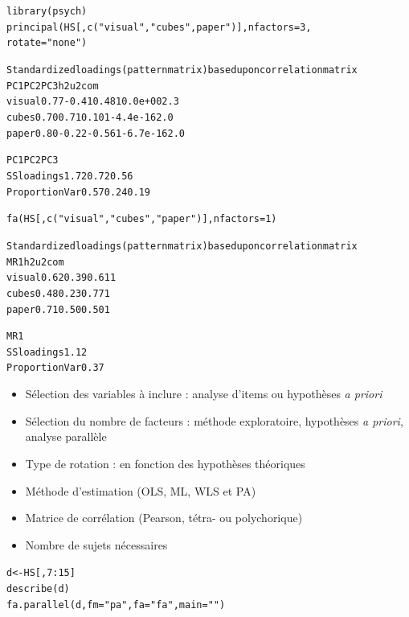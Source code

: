 \begin{alltt}
library(psych)
principal(HS[,c("visual","cubes", paper")], \textcolor{Apricot}{nfactors = 3}, 
          rotate = "none")
\end{alltt}
\begin{alltt}\small
Standardized loadings (pattern matrix) based upon correlation matrix
        PC1   PC2   PC3 h2       u2 com
visual 0.77 -0.41  0.48  1  0.0e+00 2.3
cubes  0.70  0.71  0.10  1 -4.4e-16 2.0 
paper  0.80 -0.22 -0.56  1 -6.7e-16 2.0

                       PC1  PC2  PC3
SS loadings           1.72 0.72 0.56
Proportion Var        0.57 0.24 0.19
\end{alltt}

\foilhead{}

\begin{alltt}
fa(HS[,c("visual", "cubes", "paper")], nfactors = 1)
\end{alltt}
\begin{alltt}\small
Standardized loadings (pattern matrix) based upon correlation matrix
        MR1   h2   u2 com
visual 0.62 0.39 0.61   1
cubes  0.48 0.23 0.77   1 
paper  0.71 0.50 0.50   1

                MR1
SS loadings    1.12
Proportion Var 0.37
\end{alltt}

\begin{itemize}
\item Sélection des variables à inclure : analyse d'items ou hypothèses \emph{a
    priori}
\item Sélection du nombre de facteurs : méthode exploratoire, hypothèses \emph{a
    priori}, analyse parallèle
\item Type de rotation : en fonction des hypothèses théoriques
\item Méthode d'estimation (OLS, ML, WLS et PA)
\item Matrice de corrélation (Pearson, tétra- ou polychorique)  
\item Nombre de sujets nécessaires \autocite{rouquette11}
\end{itemize}



\begin{alltt}
d <- HS[,7:15]
describe(d)
fa.parallel(d, fm = "pa", fa = "fa", main = "")
\end{alltt}

